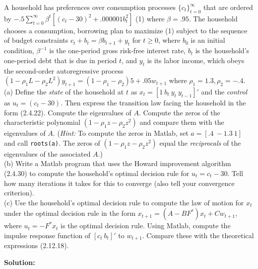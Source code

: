 \documentclass[12pt, letterpaper]{article}
\begin{document}
\begin{tcolorbox}[oddbox,title={Exercise 2.13 \quad Permanent Income by Howard Improvement}]
\begin{tcolorbox}[questionbox]
A household has preferences over consumption processes $\{c_t\}_{t=0}^\infty$ that are ordered by
$-.5\sum_{t=0}^\infty\beta^t\left[(c_t-30)^2+.000001b_t^2\right]$ (1) where $\beta=.95$. The household
chooses a consumption, borrowing plan to maximize (1) subject to the sequence of budget constraints
$c_t+b_t=\beta b_{t+1}+y_t$ for $t\ge0$, where $b_0$ is an initial condition, $\beta^{-1}$ is the
one-period gross risk-free interest rate, $b_t$ is the household's one-period debt that is due in
period $t$, and $y_t$ is its labor income, which obeys the second-order autoregressive process
$(1-\rho_1L-\rho_2L^2)y_{t+1}=(1-\rho_1-\rho_2)5+.05w_{t+1}$ where $\rho_1=1.3,\rho_2=-.4$.\\[3pt]
(a) Define the \textit{state} of the household at $t$ as $x_t=[1\ b_t\ y_t\ y_{t-1}]'$ and the
\textit{control} as $u_t=(c_t-30)$. Then express the transition law facing the household in the form
(2.4.22). Compute the eigenvalues of $A$. Compute the zeros of the characteristic polynomial
$(1-\rho_1z-\rho_2z^2)$ and compare them with the eigenvalues of $A$. (\textit{Hint:} To compute the
zeros in Matlab, set $a=[.4\ -1.3\ 1]$ and call \texttt{roots(a)}. The zeros of $(1-\rho_1z-\rho_2z^2)$
equal the \textit{reciprocals} of the eigenvalues of the associated $A$.)\\
(b) Write a Matlab program that uses the Howard improvement algorithm (2.4.30) to compute the
household's optimal decision rule for $u_t=c_t-30$. Tell how many iterations it takes for this to
converge (also tell your convergence criterion).\\
(c) Use the household's optimal decision rule to compute the law of motion for $x_t$ under the optimal
decision rule in the form $x_{t+1}=(A-BF^*)x_t+Cw_{t+1}$, where $u_t=-F^*x_t$ is the optimal decision
rule. Using Matlab, compute the impulse response function of $[c_t\ b_t]'$ to $w_{t+1}$. Compare these
with the theoretical expressions (2.12.18).
\end{tcolorbox}

\textbf{Solution:}


\end{tcolorbox}
\end{document}
